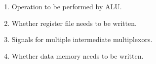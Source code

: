 \documentclass[12pt,a4paper]{article}
\begin{document}
\begin{enumerate}
\item Operation to be performed by ALU.
\item Whether register file needs to be written.
\item Signals for multiple intermediate multiplexors.
\item Whether data memory needs to be written. 
\end{enumerate}




 

\end{document}
